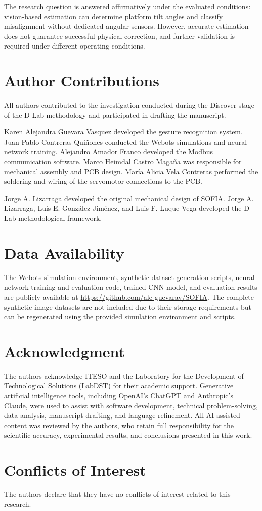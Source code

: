 \documentclass[lettersize,journal]{IEEEtran}
\begin{document}
The research question is answered affirmatively
under the evaluated conditions: vision-based
estimation can determine platform tilt angles
and classify misalignment without dedicated
angular sensors. However, accurate estimation
does not guarantee successful physical correction,
and further validation is required under
different operating conditions.

	
	\section*{Author Contributions}
	All authors contributed to the investigation conducted
	during the Discover stage of the D-Lab methodology and
	participated in drafting the manuscript.
	
	Karen Alejandra Guevara Vasquez developed the gesture
	recognition system. Juan Pablo Contreras Quiñones
	conducted the Webots simulations and neural network
	training. Alejandro Amador Franco developed the Modbus
	communication software. Marco Heimdal Castro Magaña
	was responsible for mechanical assembly and PCB design. María Alicia Vela Contreras
	performed the soldering and wiring of the servomotor
	connections to the PCB.
	
	Jorge A. Lizarraga developed the original mechanical
	design of SOFIA. Jorge A. Lizarraga, Luis E.
	González-Jiménez, and Luis F. Luque-Vega developed
	the D-Lab methodological framework.
	
	\section*{Data Availability}
	The Webots simulation environment, synthetic dataset
	generation scripts, neural network training and
	evaluation code, trained CNN model, and evaluation
	results are publicly available at
	\url{https://github.com/ale-guevarav/SOFIA}.
	The complete synthetic image datasets are not included
	due to their storage requirements but can be
	regenerated using the provided simulation environment
	and scripts.
	
	
	\section*{Acknowledgment}
	The authors acknowledge ITESO and the Laboratory
	for the Development of Technological Solutions
	(LabDST) for their academic support.
	Generative artificial intelligence tools,
	including OpenAI's ChatGPT and Anthropic's Claude,
	were used to assist with software development,
	technical problem-solving, data analysis,
	manuscript drafting, and language refinement.
	All AI-assisted content was reviewed by the authors,
	who retain full responsibility for the scientific
	accuracy, experimental results, and conclusions
	presented in this work.
	
	
	\section*{Conflicts of Interest}
	The authors declare that they have no conflicts
	of interest related to this research.
	
	\balance
	
	
	
	
\end{document}
